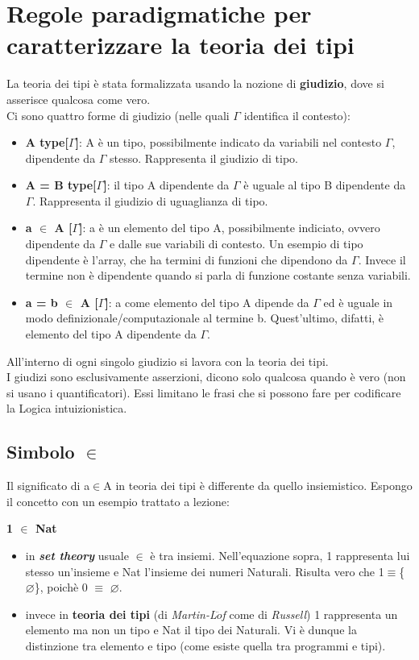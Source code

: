 \section{Regole paradigmatiche per caratterizzare la teoria dei tipi}
\label{sec:prime-regole-teoria-dei-tipi}
La teoria dei tipi \`e stata formalizzata usando la nozione di \textbf{giudizio}, dove si asserisce qualcosa come vero.\\
Ci sono quattro forme di giudizio (nelle quali $\Gamma$ identifica il contesto):
\begin{itemize}
\item \textbf{A type[$\Gamma$]}: A \`e un tipo, possibilmente indicato da variabili nel contesto $\Gamma$, dipendente da $\Gamma$ stesso. Rappresenta il giudizio di tipo.
\item \textbf{A = B type[$\Gamma$]}: il tipo A dipendente da $\Gamma$ \`e uguale al tipo B dipendente da $\Gamma$. Rappresenta il giudizio di uguaglianza di tipo.
\item \textbf{a $\in$ A [$\Gamma$]}: a \`e un elemento del tipo A, possibilmente indiciato, ovvero dipendente da $\Gamma$ e dalle sue variabili di contesto. Un esempio di tipo dipendente \`e l'array, che ha termini di funzioni che dipendono da $\Gamma$. Invece il termine non \`e dipendente quando si parla di funzione costante senza variabili.
\item \textbf{a = b $\in$ A [$\Gamma$]}: a come elemento del tipo A dipende da $\Gamma$ ed \`e uguale in modo definizionale/computazionale al termine b. Quest'ultimo, difatti, \`e elemento del tipo A dipendente da $\Gamma$.
\end{itemize}
\noindent
All'interno di ogni singolo giudizio si lavora con la teoria dei tipi.\\
I giudizi sono esclusivamente asserzioni, dicono solo qualcosa quando \`e vero (non si usano i quantificatori). Essi limitano le frasi che si possono fare per codificare la Logica intuizionistica. 
\subsection{Simbolo $\in$}
\label{subsec:simbolo-appartiene}
Il significato di a$\in$A in teoria dei tipi \`e differente da quello insiemistico. Espongo il concetto con un esempio trattato a lezione:
\begin{center}
\textbf{1 $\in$ Nat}
\end{center}


\begin{itemize}
\item in \textbf{\textit{set theory}} usuale $\in$ \`e tra insiemi. Nell'equazione sopra, 1 rappresenta lui stesso un'insieme e Nat l'insieme dei numeri Naturali.
Risulta vero che 1$\equiv$\{$\varnothing$\}, poich\`e 0 $\equiv$ $\varnothing$.
\item invece in \textbf{teoria dei tipi} (di \textit{Martin-L$\ddot{o}$f} come di \textit{Russell})
1 rappresenta un elemento ma non un tipo e Nat il tipo dei Naturali. Vi \`e dunque la distinzione tra elemento e tipo (come esiste quella tra programmi e tipi).
\end{itemize}
